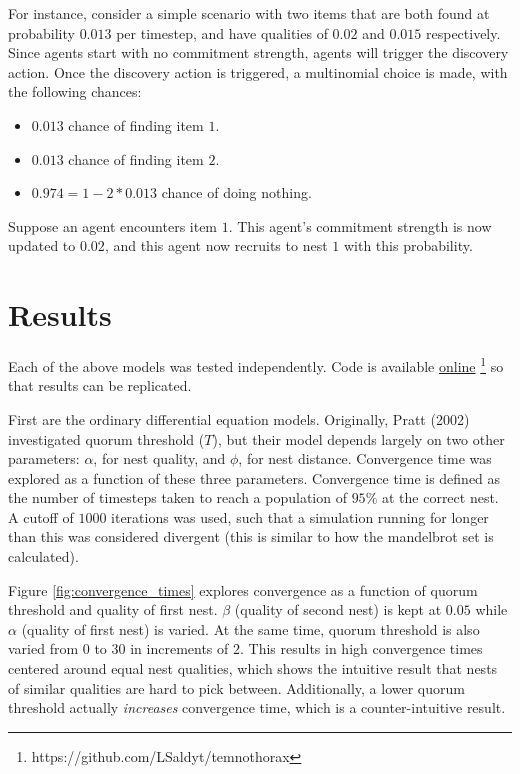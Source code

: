 \documentclass{article}
\begin{document}
For instance, consider a simple scenario with two items that are both found at probability $0.013$ per timestep, and have qualities of $0.02$ and $0.015$ respectively.
Since agents start with no commitment strength, agents will trigger the discovery action.
Once the discovery action is triggered, a multinomial choice is made, with the following chances:
\begin{itemize}
    \item $0.013$ chance of finding item $1$.
    \item $0.013$ chance of finding item $2$.
    \item $0.974 = 1 - 2 * 0.013$ chance of doing nothing.
\end{itemize}

Suppose an agent encounters item $1$. This agent's commitment strength is now updated to $0.02$, and this agent now recruits to nest $1$ with this probability.

\section{Results}

Each of the above models was tested independently. Code is available \href{https://github.com/LSaldyt/temnothorax}{online} \footnote{https://github.com/LSaldyt/temnothorax} so that results can be replicated. 

First are the ordinary differential equation models.
Originally, Pratt (2002) investigated quorum threshold ($T$), but their model depends largely on two other parameters: $\alpha$, for nest quality, and $\phi$, for nest distance.
Convergence time was explored as a function of these three parameters. 
Convergence time is defined as the number of timesteps taken to reach a population of $95\%$ at the correct nest.
A cutoff of $1000$ iterations was used, such that a simulation running for longer than this was considered divergent (this is similar to how the mandelbrot set is calculated).

Figure \ref{fig:convergence_times} explores convergence as a function of quorum threshold and quality of first nest. 
$\beta$ (quality of second nest) is kept at $0.05$ while $\alpha$ (quality of first nest) is varied.
At the same time, quorum threshold is also varied from $0$ to $30$ in increments of $2$.
This results in high convergence times centered around equal nest qualities, which shows the intuitive result that nests of similar qualities are hard to pick between.
Additionally, a lower quorum threshold actually \emph{increases} convergence time, which is a counter-intuitive result.
\end{document}
